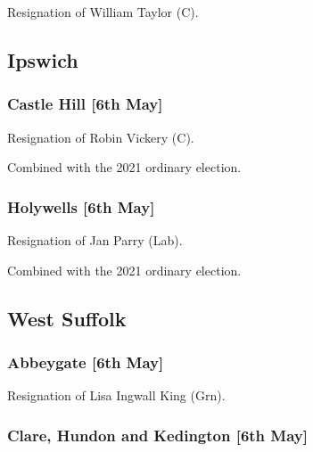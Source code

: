 \documentclass[a4paper,openany]{book}
\begin{document}
\begin{resultsiii}

Resignation of William Taylor (C).

\subsection*{Ipswich}

\subsubsection*{Castle Hill \hspace*{\fill}\nolinebreak[1]%
	\enspace\hspace*{\fill}
	[6th May]}


Resignation of Robin Vickery (C).

Combined with the 2021 ordinary election.

\subsubsection*{Holywells \hspace*{\fill}\nolinebreak[1]%
	\enspace\hspace*{\fill}
	[6th May]}


Resignation of Jan Parry (Lab).

Combined with the 2021 ordinary election.

\subsection*{West Suffolk}

\subsubsection*{Abbeygate \hspace*{\fill}\nolinebreak[1]%
	\enspace\hspace*{\fill}
	[6th May]}


Resignation of Lisa Ingwall King (Grn).

\subsubsection*{Clare, Hundon and Kedington \hspace*{\fill}\nolinebreak[1]%
	\enspace\hspace*{\fill}
	[6th May]}


\end{resultsiii}
\end{document}
